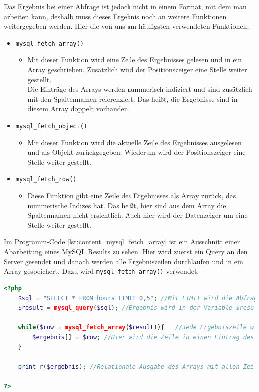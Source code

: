 Das Ergebnis bei einer Abfrage ist jedoch nicht in einem Format, mit dem man arbeiten kann, deshalb muss dieses Ergebnis noch an weitere Funktionen weitergegeben werden. Hier die von uns am häufigsten verwendeten Funktionen:
\begin{itemize}
	\item \texttt{mysql\_fetch\_array()}
	\begin{itemize}
		\item Mit dieser Funktion wird eine Zeile des Ergebnisses gelesen und in ein Array geschrieben. Zusätzlich wird der Positionszeiger eine Stelle weiter gestellt.\\
		Die Einträge des Arrays werden nummerisch indiziert und sind zusätzlich mit den Spaltennamen referenziert. Das heißt, die Ergebnisse sind in diesem Array doppelt vorhanden.
	\end{itemize}
	\item \texttt{mysql\_fetch\_object()}
		\begin{itemize}
			\item Mit dieser Funktion wird die aktuelle Zeile des Ergebnisses ausgelesen und als Objekt zurückgegeben. Wiederum wird der Positionszeiger eine Stelle weiter gestellt.
		\end{itemize}
	\item \texttt{mysql\_fetch\_row()}
		\begin{itemize}
			\item Diese Funktion gibt eine Zeile des Ergebnisses als Array zurück, das nummerische Indizes hat. Das heißt, hier sind aus dem Array die Spaltennamen nicht ersichtlich. Auch hier wird der Datenzeiger um eine Stelle weiter gestellt.
		\end{itemize}
\end{itemize}
Im Programm-Code \ref{lst:content_mysql_fetch_array} ist ein Ausschnitt einer Abarbeitung eines MySQL Results zu sehen. Hier wird zuerst ein Query an den Server gesendet und danach werden alle Ergebniszeilen durchlaufen und in ein Array gespeichert. Dazu wird \texttt{mysql\_fetch\_array()} verwendet.
\begin{lstlisting}[style=custom, language=PHP, caption={MySQL Query weiterverarbeiten},label={lst:content_mysql_fetch_array}]
<?php 
	$sql = "SELECT * FROM hours LIMIT 0,5"; //Mit LIMIT wird die Abfrage auf die ersten 5 Ergebnisse begrenzt
	$result = mysql_query($sql); //Ergebnis wird in der Variable $result gespeichert
	
	while($row = mysql_fetch_array($result)){	//Jede Ergebniszeile wird durchlaufen
		$ergebnis[] = $row;	//Hier wird die Zeile in einen Eintrag des Arrays geschrieben
	}
	
	print_r($ergebnis);	//Relationale Ausgabe des Arrays mit allen Zeilen
	
?>
\end{lstlisting}
